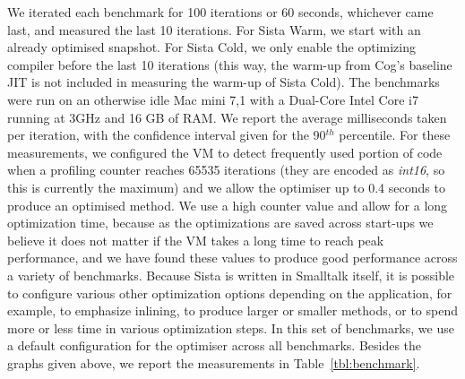\documentclass[a4paper,12pt,twoside]{../includes/ThesisStyle}
\begin{document}
We iterated each benchmark for 100 iterations or 60 seconds, whichever came last, and measured the last 10 iterations. For Sista Warm, we start with an already optimised snapshot. For Sista Cold, we only enable the optimizing compiler before the last 10 iterations (this way, the warm-up from Cog's baseline JIT is not included in measuring the warm-up of Sista Cold). The benchmarks were run on an otherwise idle Mac mini 7,1 with a Dual-Core Intel Core i7 running at 3GHz and 16 GB of RAM. We report the average milliseconds taken per iteration, with the confidence interval given for the 90$^{th}$ percentile. For these measurements, we configured the VM to detect frequently used portion of code when a profiling counter reaches 65535 iterations (they are encoded as \emph{int16}, so this is currently the maximum) and we allow the optimiser up to 0.4 seconds to produce an optimised method. We use a high counter value and allow for a long optimization time, because as the optimizations are saved across start-ups we believe it does not matter if the VM takes a long time to reach peak performance, and we have found these values to produce good performance across a variety of benchmarks. Because Sista is written in Smalltalk itself, it is possible to configure various other optimization options depending on the application, for example, to emphasize inlining, to produce larger or smaller methods, or to spend more or less time in various optimization steps. In this set of benchmarks, we use a default configuration for the optimiser across all benchmarks. Besides the graphs given above, we report the measurements in Table~\ref{tbl:benchmark}.
\end{document}
